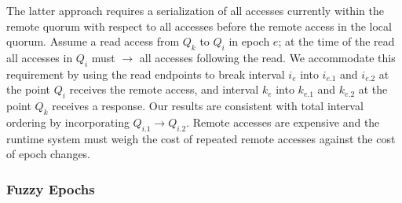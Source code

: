 \documentclass[11pt,letterpaper]{article}
\begin{document}
The latter approach requires a serialization of all accesses currently within the remote
quorum with respect to all accesses before the remote access in the local quorum.
Assume a read access from $Q_k$ to $Q_i$ in epoch $e$; at the time of the read all
accesses in $Q_i$ must $\rightarrow$ all accesses following the read.
We accommodate this requirement by using the read endpoints to break interval $i_e$ into
$i_{e.1}$ and $i_{e.2}$ at the point $Q_i$ receives the remote access, and interval $k_e$
into $k_{e.1}$ and $k_{e.2}$ at the point $Q_k$ receives a response.
Our results are consistent with total interval ordering by incorporating $Q_{i.1}
\rightarrow Q_{i.2}$.
Remote accesses are expensive and the runtime system must weigh the cost of repeated
remote accesses against the cost of epoch changes.

\subsubsection{Fuzzy Epochs}
\vspace{-.5em}
\end{document}
